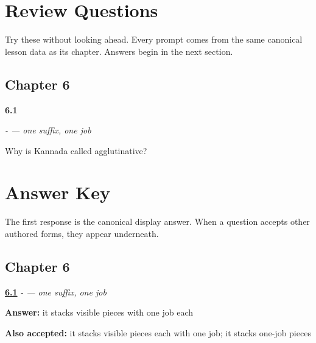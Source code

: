 
\chapter*{Review Questions}

Try these without looking ahead. Every prompt comes from the same canonical lesson data as its chapter. Answers begin in the next section.

\section*{Chapter 6}

\noindent\begin{minipage}[t]{\linewidth}
\raggedright
\hypertarget{review-KA-C06-dative-stacking-agglutinative}{\textbf{6.1}} \emph{- — one suffix, one job}\par
\small Why is Kannada called agglutinative?
\end{minipage}\par\medskip

\chapter*{Answer Key}

The first response is the canonical display answer. When a question accepts other authored forms, they appear underneath.

\section*{Chapter 6}

\noindent\begin{minipage}[t]{\linewidth}
\raggedright
\hyperlink{review-KA-C06-dative-stacking-agglutinative}{\textbf{6.1}} \emph{- — one suffix, one job}\par
\small \textbf{Answer:} it stacks visible pieces with one job each\par
\footnotesize \textbf{Also accepted:} it stacks visible pieces each with one job; it stacks one-job pieces
\end{minipage}\par\medskip
